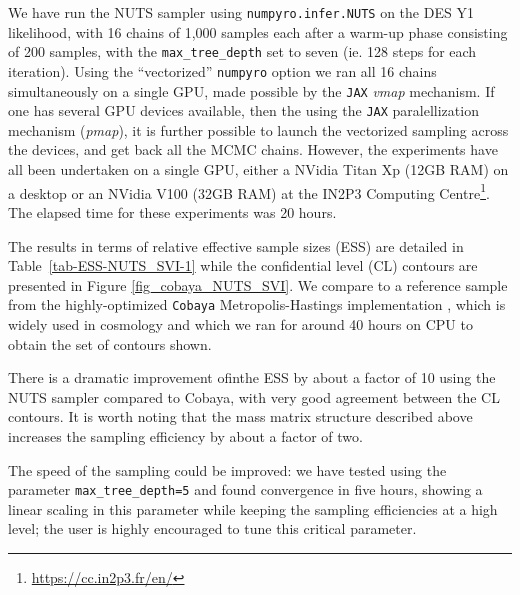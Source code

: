 \documentclass[twocolumn,twocolappendix,nofootinbib,iop]{openjournal}
\newcommand{\FrL}[1]{{\color{cyan}FL: #1}}
\begin{document}


We have run the NUTS sampler using \texttt{numpyro.infer.NUTS} on the DES Y1 likelihood,  with 16 chains of 1,000 samples each after a warm-up phase consisting of 200 samples, with the \texttt{max\_tree\_depth} set to seven (ie. 128 steps for each iteration). %
Using the ``vectorized'' \texttt{numpyro} option we ran all 16 chains simultaneously on a single GPU, made possible by the \texttt{JAX} \textit{vmap} mechanism. If one has several GPU devices available, then the using the \texttt{JAX} paralellization mechanism (\textit{pmap}), it is further possible to launch the vectorized sampling across the devices, and get back all the MCMC chains. However, the experiments have all been undertaken on a single GPU, either a NVidia Titan Xp (12GB RAM) on a desktop or an NVidia V100 (32GB RAM) at the IN2P3 Computing Centre\footnote{\url{https://cc.in2p3.fr/en/}}. The elapsed time for these experiments was 20 hours.

The results in terms of relative effective sample sizes (ESS) are detailed in Table~\ref{tab-ESS-NUTS_SVI-1} while the confidential level (CL) contours are presented in Figure \ref{fig_cobaya_NUTS_SVI}. We compare to a reference sample from the highly-optimized \texttt{Cobaya} Metropolis-Hastings implementation \citep{2019ascl.soft10019T,2021JCAP...05..057T}, which is widely used in cosmology and which we ran for around 40 hours on CPU to obtain the set of contours shown.

There is a dramatic improvement ofinthe ESS by about a factor of 10 using the NUTS sampler compared to Cobaya, with very good agreement between the CL contours. It is worth noting that the mass matrix structure described above increases the sampling efficiency by about a factor of two.

The speed of the sampling could be improved: we have tested using the parameter \texttt{max\_tree\_depth=5} and found convergence in five hours, showing a linear scaling in this parameter while keeping the sampling efficiencies at a high level; the user is highly encouraged to tune this critical parameter. 
\end{document}

